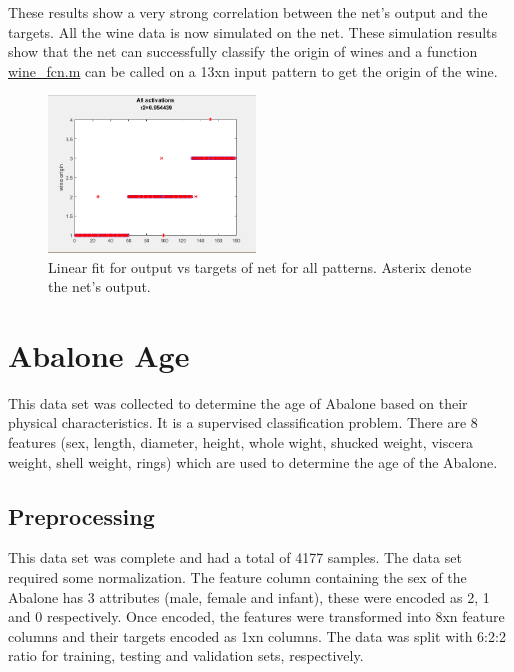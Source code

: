 \documentclass[10pt]{article}
\begin{document}
These results show a very strong correlation between the net's output and the targets. All the wine data is now simulated on the net. These simulation results show that the net can successfully classify the origin of wines and a function \url{wine_fcn.m} can be called on a 13xn input pattern to get the origin of the wine. 

\begin{center}
\begin{figure}[h]
\centering
\includegraphics[width=0.49\textwidth]{wine_ar}
\caption{Linear fit for output vs targets of net for all patterns. Asterix denote the net's output.}
\end{figure}
\end{center}

\newpage
\section{Abalone Age}
This data set was collected to determine the age of Abalone based on their physical characteristics. It is a supervised classification problem. There are 8 features (sex, length, diameter, height, whole wight, shucked weight, viscera weight, shell weight, rings) which are used to determine the age of the Abalone.
\subsection{Preprocessing}
This data set was complete and had a total of 4177 samples. The data set required some normalization. The feature column containing the sex of the Abalone has 3 attributes (male, female and infant), these were encoded as 2, 1 and 0 respectively. Once encoded, the features were transformed into 8xn feature columns and their targets encoded as 1xn columns. The data was split with 6:2:2 ratio for training, testing and validation sets, respectively.
\end{document}
